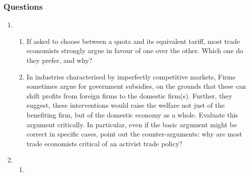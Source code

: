 \documentclass[12pt,onesided]{article}
\begin{document}
\subsubsection*{Questions} 
\begin{enumerate}
	\item 
	
	\begin{enumerate}
		\item If asked to choose between a quota and its equivalent tariff, most trade economists strongly argue in favour of one over the other. Which one do they prefer, and why? 
		\item In industries characterised by imperfectly competitive markets, Firms sometimes argue for government subsidies, on the grounds that these can shift profits from foreign firms to the domestic firm(s). Further, they suggest, these interventions would raise the welfare not just of the benefiting firm, but of the domestic economy as a whole. Evaluate this argument critically. In particular, even if the basic argument might be correct in specific cases, point out the counter-arguments: why are most trade economists critical of an activist trade policy? 
	\end{enumerate}
	\item 
	\begin{enumerate}
		\item 
		

\end{enumerate}
\end{enumerate}
\end{document}
